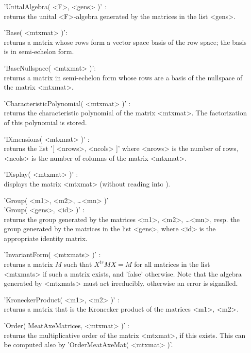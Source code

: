 'UnitalAlgebra( <F>, <gens> )' : \\
     returns the unital <F>-algebra generated by the {\MeatAxe} matrices
     in the list <gens>.

'Base( <mtxmat> )': \\
     returns a {\MeatAxe} matrix whose rows form a vector space basis of the
     row space; the basis is in semi-echelon form.

'BaseNullspace( <mtxmat> )': \\
     returns a {\MeatAxe} matrix in semi-echelon form whose rows are a basis
     of the nullspace of the {\MeatAxe} matrix <mtxmat>.

'CharacteristicPolynomial( <mtxmat> )' : \\
     returns the characteristic polynomial of the {\MeatAxe} matrix <mtxmat>.
     The factorization of this polynomial is stored.

'Dimensions( <mtxmat> )' : \\
     returns the list '[ <nrows>, <ncols> ]' where <nrows> is
     the number of rows, <ncols> is the number of columns of
     the {\MeatAxe} matrix <mtxmat>.

'Display( <mtxmat> )' : \\
     displays the {\MeatAxe} matrix <mtxmat> (without reading into {\GAP}).

'Group( <m1>, <m2>, \ldots <mn> )' \\
'Group( <gens>, <id> )' : \\
     returns the group generated by the {\MeatAxe} matrices <m1>, <m2>,
     \ldots <mn>, resp. the group generated by the {\MeatAxe} matrices in
     the list <gens>, where <id> is the appropriate identity {\MeatAxe}
     matrix.

'InvariantForm( <mtxmats> )' : \\
     returns a {\MeatAxe} matrix $M$ such that $X^{tr} M X = M$ for all
     {\MeatAxe} matrices in the list <mtxmats> if such a matrix exists,
     and 'false' otherwise.  Note that the algebra generated by <mtxmats>
     must act irreducibly, otherwise an error is signalled.

'KroneckerProduct( <m1>, <m2> )' : \\
     returns a {\MeatAxe} matrix that is the Kronecker product of the
     {\MeatAxe} matrices <m1>, <m2>.

'Order( MeatAxeMatrices, <mtxmat> )' : \\
     returns the multiplicative order of the {\MeatAxe} matrix <mtxmat>,
     if this exists.
     This can be computed also by 'OrderMeatAxeMat( <mtxmat> )'.

